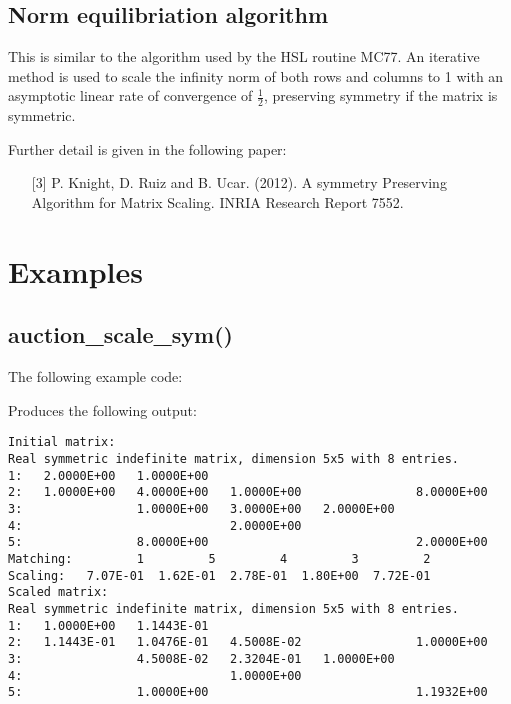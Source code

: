 \subsection{Norm equilibriation algorithm}
This is similar to the algorithm used by the HSL routine MC77.
An iterative method
is used to scale the infinity norm of both rows and columns to 1 with an asymptotic linear rate of convergence of $\frac{1}{2}$, preserving symmetry if the matrix is symmetric.

\noindent
Further detail is given in the following paper:
\begin{itemize}
   \item[{[3]}] P. Knight, D. Ruiz and B. Ucar. (2012). A symmetry Preserving Algorithm for Matrix Scaling. INRIA Research Report 7552.
\end{itemize}



\section{Examples} \label{examples}

\subsection{auction\_scale\_sym()}
The following example code:

Produces the following output:
\begin{verbatim}
Initial matrix:
Real symmetric indefinite matrix, dimension 5x5 with 8 entries.
1:   2.0000E+00   1.0000E+00                                       
2:   1.0000E+00   4.0000E+00   1.0000E+00                8.0000E+00
3:                1.0000E+00   3.0000E+00   2.0000E+00             
4:                             2.0000E+00                          
5:                8.0000E+00                             2.0000E+00
Matching:         1         5         4         3         2
Scaling:   7.07E-01  1.62E-01  2.78E-01  1.80E+00  7.72E-01
Scaled matrix:
Real symmetric indefinite matrix, dimension 5x5 with 8 entries.
1:   1.0000E+00   1.1443E-01                                       
2:   1.1443E-01   1.0476E-01   4.5008E-02                1.0000E+00
3:                4.5008E-02   2.3204E-01   1.0000E+00             
4:                             1.0000E+00                          
5:                1.0000E+00                             1.1932E+00
\end{verbatim}


